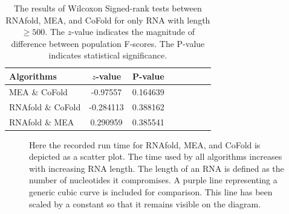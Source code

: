 \documentclass[12pt, a4paper]{article}
\begin{document}
\begin{table}
\centering
\begin{tabular}{l*{6}{c}r}
Algorithms	& $z$-value & P-value \\
\hline 
MEA \& CoFold &  -0.97557    &    0.164639   \\
RNAfold \& CoFold &  -0.284113    &    0.388162  \\
RNAfold \& MEA &  0.290959   &    0.385541  \\
\end{tabular}
\caption{The results of Wilcoxon Signed-rank tests between RNAfold, MEA, and CoFold for only RNA with length $\geq 500$. The $z$-value indicates the magnitude of difference between population F-scores. The P-value indicates statistical significance.}
\label{tab:wilcoxon}
\end{table}


\begin{figure}
\begin{center}
\end{center}
\caption{Here the recorded run time for RNAfold, MEA, and CoFold is depicted as a scatter plot. The time used by all algorithms increases with increasing RNA length. The length of an RNA is defined as the number of nucleotides it compromises. A purple line representing a generic cubic curve is included for comparison. This line has been scaled by a constant so that it remains visible on the diagram.}
\label{fig:timegraph}
\end{figure}
\end{document}
